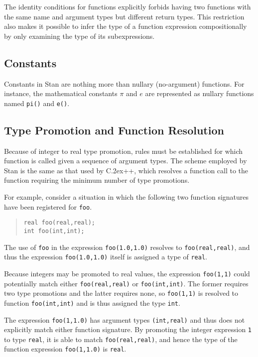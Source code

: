 \documentclass[10pt]{report}
\newcommand{\Stan}{Stan\xspace}
\newcommand*{\Cpp}{C\raise.2ex\hbox{\footnotesize ++}\xspace} %
\newcommand{\code}[1]{{\tt #1}}
\begin{document}
The identity conditions for functions explicitly forbids having two
functions with the same name and argument types but different return
types.  This restriction also makes it possible to infer the type of a
function expression compositionally by only examining the type of its
subexpressions. 

\subsection{Constants}

Constants in \Stan are nothing more than nullary (no-argument)
functions.  For instance, the mathematical constants $\pi$ and $e$ are
represented as nullary functions named \code{pi()} and \code{e()}.

\subsection{Type Promotion and Function Resolution}

Because of integer to real type promotion, rules must be established
for which function is called given a sequence of argument types.  The
scheme employed by \Stan is the same as that used by \Cpp, which
resolves a function call to the function requiring the minimum number
of type promotions.  

For example, consider a situation in which the following two function
signatures have been registered for \code{foo}.
%
\begin{quote}
\code{real foo(real,real);}
\\
\code{int foo(int,int);}
\end{quote}
%
The use of \code{foo} in the expression \code{foo(1.0,1.0)} resolves
to \code{foo(real,real)}, and thus the expression \code{foo(1.0,1.0)}
itself is assigned a type of \code{real}.  

Because integers may be promoted to real values, the expression
\code{foo(1,1)} could potentially match either \code{foo(real,real)}
or \code{foo(int,int)}.  The former requires two type promotions and
the latter requires none, so \code{foo(1,1)} is resolved to function
\code{foo(int,int)} and is thus assigned the type \code{int}.

The expression \code{foo(1,1.0)} has argument types \code{(int,real)}
and thus does not explicitly match either function signature.  By
promoting the integer expression \code{1} to type \code{real}, it is
able to match \code{foo(real,real)}, and hence the type of the
function expression \code{foo(1,1.0)} is \code{real}.
\end{document}
